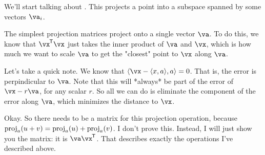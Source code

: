 We'll start talking about . This projects a
point into a subspace spanned by some vectors $\va_i$.

The simplest projection matrices project onto a single vector $\va$. To
do this, we know that $\vat \vx$ just takes the inner product of $\va$
and $\vx$, which is how much we want to scale $\va$ to get the "closest"
point to $\vx$ along $\va$.

Let's take a quick note. We know that $\iprod{\vx - \iprod{x}{a}}{a} =
0$. That is, the error is perpindicular to $\va$. Note that this will
*always* be part of the error of $\vx - r\va$, for any scalar $r$. So
all we can do is eliminate the component of the error along $\va$, which
minimizes the distance to $\vx$.

Okay. So there needs to be a matrix for this projection operation,
because $\operatorname{proj}_{a}\mathopen{}\left( {u+v} \right)\mathclose{}=\operatorname{proj}_{a}\mathopen{}\left( {u} \right)\mathclose{}+\operatorname{proj}_{a}\mathopen{}\left( {v} \right)\mathclose{}$. I don't prove this.
Instead, I will just show you the matrix: it is $\va \vat$. That
describes exactly the operations I've described above.
